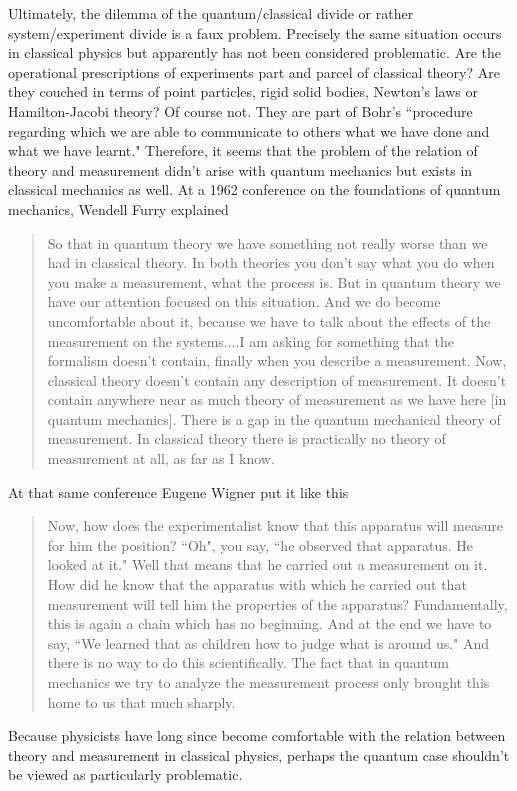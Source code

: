\documentclass[12pt]{article}
\begin{document}
Ultimately, the dilemma of the quantum/classical divide or rather system/experiment divide is a faux problem.  Precisely the same situation occurs in classical physics but apparently has not been considered problematic.  Are the operational prescriptions of experiments part and parcel of classical theory? Are they couched in terms of point particles, rigid solid bodies, Newton's laws or Hamilton-Jacobi theory?  Of course not. They are part of Bohr's ``procedure regarding which we are able to communicate to others what we have done and what we have learnt."  Therefore, it seems that the problem of the relation of theory and measurement didn't arise with quantum mechanics but exists in classical mechanics as well.  At a 1962 conference on the foundations of quantum mechanics, Wendell Furry explained\cite{Fu1962}
\begin{quote}
So that in quantum theory we have something not really worse than we had in classical theory. In both theories you don't say what you do when you make a measurement, what the process is. But in quantum theory we have our attention focused on this situation. And we do become uncomfortable about it, because we have to talk about the effects of the measurement on the systems....I am asking for something that the formalism doesn't contain, finally when you describe a measurement. Now, classical theory doesn't contain any description of measurement. It doesn't contain anywhere near as much theory of measurement as we have here [in quantum mechanics]. There is a gap in the quantum mechanical theory of measurement. In classical theory there is practically no theory of measurement at all, as far as I know. 
\end{quote}
At that same conference Eugene Wigner put it like this \cite{Wi1962}
\begin{quote}
Now, how does the experimentalist know that this apparatus will measure for him the position? ``Oh", you say, ``he observed that apparatus. He looked at it." Well that means that he carried out a measurement on it. How did he know that the apparatus with which he carried out that measurement will tell him the properties of the apparatus? Fundamentally, this is again a chain which has no beginning. And at the end we have to say, ``We learned that as children how to judge what is around us."  And there is no way to do this scientifically. The fact that in quantum mechanics we try to analyze the measurement process only brought this home to us that much sharply.  
\end{quote}
Because physicists have long since become comfortable with the relation between theory and measurement in classical physics, perhaps the quantum case shouldn't be viewed as particularly problematic.  
\end{document}
